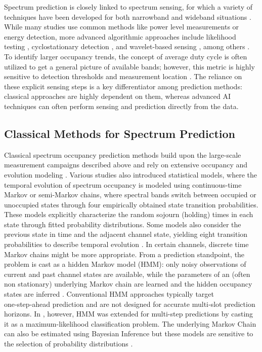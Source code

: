\documentclass[lettersize,journal]{IEEEtran}
\begin{document}
Spectrum prediction is closely linked to spectrum sensing, for which a variety of techniques have been developed for both narrowband and wideband situations \cite{Muzaffar_2024}. While many studies use common methods like power level measurements or energy detection, more advanced algorithmic approaches include likelihood testing \cite{Segura_2010}, cyclostationary detection \cite{Yucek_2009}, and wavelet-based sensing \cite{Tian_2006}, among others \cite{Muzaffar_2024}. To identify larger occupancy trends, the concept of average duty cycle is often utilized to get a general picture of available bands; however, this metric is highly sensitive to detection thresholds and measurement location \cite{Wellens_2010}. The reliance on these explicit sensing steps is a key differentiator among prediction methods: classical approaches are highly dependent on them, whereas advanced AI techniques can often perform sensing and prediction directly from the data.

\subsection{Classical Methods for Spectrum Prediction}

Classical spectrum occupancy prediction methods build upon the large-scale measurement campaigns described above and rely on extensive occupancy and evolution modeling \cite{Chen_2016}. Various studies also introduced statistical models, where the temporal evolution of spectrum occupancy is modeled using continuous-time Markov or semi-Markov chains, where spectral bands switch between occupied or unoccupied states through four empirically obtained state transition probabilities. These models explicitly characterize the random sojourn (holding) times in each state through fitted probability distributions. Some models also consider the previous state in time and the adjacent channel state, yielding eight transition probabilities to describe temporal evolution \cite{Gibson_1994, Percival_1997}. In certain channels, discrete time Markov chains might be more appropriate. From a prediction standpoint, the problem is cast as a hidden Markov model (HMM): only noisy observations of current and past channel states are available, while the parameters of an (often non stationary) underlying Markov chain are learned and the hidden occupancy states are inferred \cite{Chen_2011, Akbar_2007}. Conventional HMM approaches typically target one‑step‑ahead prediction and are not designed for accurate multi‑slot prediction horizons. In \cite{Saad_2016}, however, HMM was extended for multi-step predictions by casting it as a maximum-likelihood classification problem. The underlying Markov Chain can also be estimated using Bayesian Inference \cite{Xing_2013_channel_qual} but these models are sensitive to the selection of probability distributions \cite{Pan_2026}.
\end{document}
